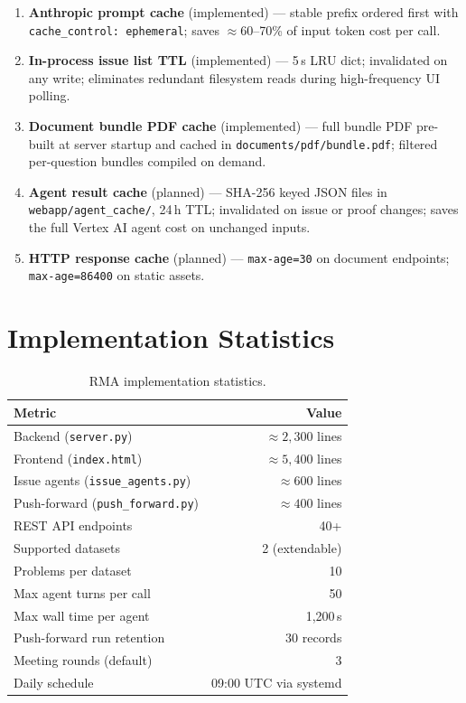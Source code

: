 \documentclass[11pt]{article}
\begin{document}
\begin{enumerate}[nosep]
  \item \textbf{Anthropic prompt cache} (implemented) --- stable prefix
    ordered first with \texttt{cache\_control: ephemeral}; saves
    ${\approx}60$--70\% of input token cost per call.
  \item \textbf{In-process issue list TTL} (implemented) --- 5\,s LRU dict;
    invalidated on any write; eliminates redundant filesystem reads during
    high-frequency UI polling.
  \item \textbf{Document bundle PDF cache} (implemented) --- full bundle PDF
    pre-built at server startup and cached in \texttt{documents/pdf/bundle.pdf};
    filtered per-question bundles compiled on demand.
  \item \textbf{Agent result cache} (planned) --- SHA-256 keyed JSON files
    in \texttt{webapp/agent\_cache/}, 24\,h TTL; invalidated on issue or
    proof changes; saves the full Vertex AI agent cost on unchanged inputs.
  \item \textbf{HTTP response cache} (planned) --- \texttt{max-age=30} on
    document endpoints; \texttt{max-age=86400} on static assets.
\end{enumerate}


\section{Implementation Statistics}

\begin{table}[h]
\centering
\small
\begin{tabularx}{\linewidth}{@{}Xr@{}}
\toprule
\textbf{Metric} & \textbf{Value} \\
\midrule
Backend (\texttt{server.py})              & ${\approx}2{,}300$ lines \\
Frontend (\texttt{index.html})            & ${\approx}5{,}400$ lines \\
Issue agents (\texttt{issue\_agents.py})  & ${\approx}600$ lines \\
Push-forward (\texttt{push\_forward.py})  & ${\approx}400$ lines \\
REST API endpoints                        & 40+ \\
Supported datasets                        & 2 (extendable) \\
Problems per dataset                      & 10 \\
Max agent turns per call                  & 50 \\
Max wall time per agent                   & 1,200\,s \\
Push-forward run retention                & 30 records \\
Meeting rounds (default)                  & 3 \\
Daily schedule                            & 09:00 UTC via systemd \\
\bottomrule
\end{tabularx}
\caption{RMA implementation statistics.}
\end{table}
\end{document}
